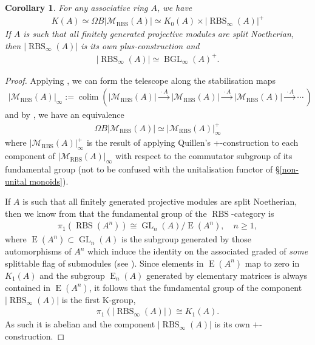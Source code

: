 \documentclass[12pt, reqno]{amsart}
\theoremstyle{plain}
\newtheorem{corollary}[theorem]{Corollary}
\theoremstyle{definition}
\begin{document}
\begin{corollary}\label{applying the group completion theorem}
For any associative ring $A$, we have
\begin{align*}
K(A)\simeq \Omega B|\mathscr{M}_{\operatorname{RBS}}(A)|\simeq K_0(A)\times |\operatorname{RBS}_\infty(A)|^+
\end{align*}
If $A$ is such that all finitely generated projective modules are split Noetherian, then $|\operatorname{RBS}_\infty(A)|$ is its own plus-construction and
\begin{align*}
|\operatorname{RBS}_\infty(A)|\simeq \operatorname{BGL}_\infty(A)^+.
\end{align*}
\end{corollary}
\begin{proof}
Applying \cite[Theorem 1.1]{RandalWilliams}, we can form the telescope along the stabilisation maps
\begin{align*}
|\mathscr{M}_{\operatorname{RBS}}(A)|_\infty :=\operatorname{colim}(|\mathscr{M}_{\operatorname{RBS}}(A)|\xrightarrow {\,\cdot A\,}|\mathscr{M}_{\operatorname{RBS}}(A)|\xrightarrow {\,\cdot A\,} |\mathscr{M}_{\operatorname{RBS}}(A)|\xrightarrow {\,\cdot A\,} \cdots\, )
\end{align*}
and by \cite[Corollary 1.2]{RandalWilliams}, we have an equivalence
\begin{align*}
\Omega B|\mathscr{M}_{\operatorname{RBS}}(A)| \simeq |\mathscr{M}_{\operatorname{RBS}}(A)|_\infty^+
\end{align*}
where $|\mathscr{M}_{\operatorname{RBS}}(A)|_\infty^+$ is the result of applying Quillen's +-construction to each component of $|\mathscr{M}_{\operatorname{RBS}}(A)|_\infty$ with respect to the commutator subgroup of its fundamental group (not to be confused with the unitalisation functor of \S \ref{non-unital monoids}).

If $A$ is such that all finitely generated projective modules are split Noetherian, then we know from \cite[Theorem 5.9]{ClausenOrsnesJansen} that the fundamental group of the $\operatorname{RBS}$-category is
\begin{align*}
\pi_1(\operatorname{RBS}(A^n))\cong \operatorname{GL}_n(A)/\operatorname{E}(A^n),\quad n\geq 1,
\end{align*}
where $\operatorname{E}(A^n)\subset \operatorname{GL}_n(A)$ is the subgroup generated by those automorphisms of $A^n$ which induce the identity on the associated graded of \textit{some} splittable flag of submodules (see \cite[\S 1]{ClausenOrsnesJansen}). Since elements in $\operatorname{E}(A^n)$ map to zero in $K_1(A)$ and the subgroup $\operatorname{E}_n(A)$ generated by elementary matrices is always contained in $\operatorname{E}(A^n)$, it follows that the fundamental group of the component $|\operatorname{RBS}_\infty(A)|$ is the first K-group,
\begin{align*}
\pi_1(|\operatorname{RBS}_\infty(A)|) \cong K_1(A).
\end{align*}
As such it is abelian and the component $|\operatorname{RBS}_\infty(A)|$ is its own $+$-construction.
\end{proof}
\end{document}
